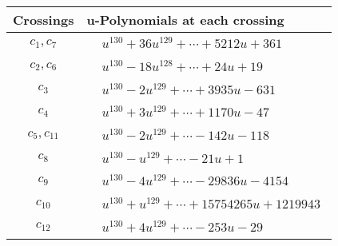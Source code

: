 \documentclass[1p]{elsarticle_modified}
\theoremstyle{definition}
\begin{document}
\begin{tabular}{m{50pt}|m{274pt}}
Crossings & \hspace{64pt}u-Polynomials at each crossing \\
\hline $$\begin{aligned}c_{1},c_{7}\end{aligned}$$&$\begin{aligned}
&u^{130}+36 u^{129}+\cdots+5212 u+361
\end{aligned}$\\
\hline $$\begin{aligned}c_{2},c_{6}\end{aligned}$$&$\begin{aligned}
&u^{130}-18 u^{128}+\cdots+24 u+19
\end{aligned}$\\
\hline $$\begin{aligned}c_{3}\end{aligned}$$&$\begin{aligned}
&u^{130}-2 u^{129}+\cdots+3935 u-631
\end{aligned}$\\
\hline $$\begin{aligned}c_{4}\end{aligned}$$&$\begin{aligned}
&u^{130}+3 u^{129}+\cdots+1170 u-47
\end{aligned}$\\
\hline $$\begin{aligned}c_{5},c_{11}\end{aligned}$$&$\begin{aligned}
&u^{130}-2 u^{129}+\cdots-142 u-118
\end{aligned}$\\
\hline $$\begin{aligned}c_{8}\end{aligned}$$&$\begin{aligned}
&u^{130}- u^{129}+\cdots-21 u+1
\end{aligned}$\\
\hline $$\begin{aligned}c_{9}\end{aligned}$$&$\begin{aligned}
&u^{130}-4 u^{129}+\cdots-29836 u-4154
\end{aligned}$\\
\hline $$\begin{aligned}c_{10}\end{aligned}$$&$\begin{aligned}
&u^{130}+u^{129}+\cdots+15754265 u+1219943
\end{aligned}$\\
\hline $$\begin{aligned}c_{12}\end{aligned}$$&$\begin{aligned}
&u^{130}+4 u^{129}+\cdots-253 u-29
\end{aligned}$\\
\hline
\end{tabular}\\~\\
\end{document}
